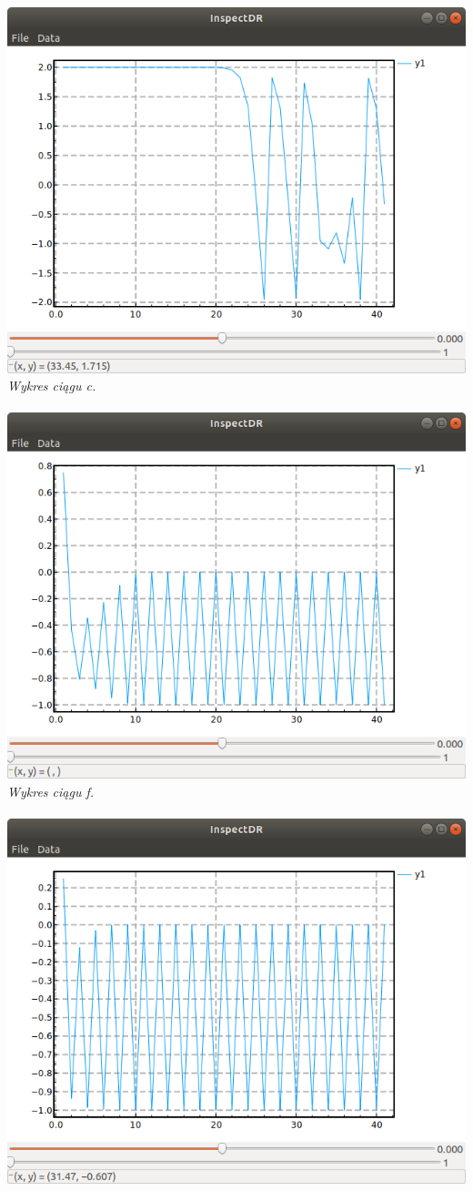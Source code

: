 \documentclass[]{article}
\begin{document}
\includegraphics[scale=0.5]{t3.png}
\\
\textit{Wykres ciągu c.}
\\\\
\includegraphics[scale=0.5]{t6.png}
\\
\textit{Wykres ciągu f.}
\\\\
\includegraphics[scale=0.5]{t7.png}
\end{document}
